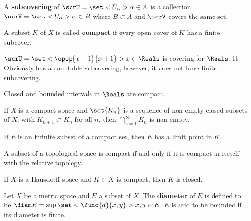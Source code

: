 \begin{definition}
    A  \textbf{subcovering} of \(\scrU = \set<U_{\alpha}>{\alpha \in A}\) is a collection \(\scrV = \set<U_{\alpha}>{\alpha \in B}\) where \(B \subset A\) and \(\scrV\) covers the same set.
\end{definition}

\begin{definition}
    A subset \(K\) of \(X\) is called \textbf{compact} if every open cover of \(K\) has a finite subcover.
\end{definition}

\begin{example}
    \(\scrU = \set<\opop{x-1}{x+1}>{x \in \Reals}\) is covering for \(\Reals\). It Obviously has a countable subcovering, however, it does not have finite subcovering.
\end{example}

\begin{theorem}
    Closed and bounded intervals in \(\Reals\) are compact.
\end{theorem}

\begin{proposition}
    If \(X\) is a compact space and \(\set{K_n}\) is a sequence of non-empty closed subsets of \(X\), with \(K_{n+1} \subset K_n\) for all \(n\), then \(\bigcap_{n = 1}^{\infty} K_n\) is non-empty.
\end{proposition}

\begin{proposition}
    If \(E\) is an infinite subset of a compact set, then \(E\) has a limit point in \(K\).
\end{proposition}

\begin{proposition}
    A subset of a topological space is compact if and only if it is compact in iteself with the relative topology.
\end{proposition}

\begin{proposition}
    If \(X\) is a Hausdorff space and \(K \subset X\) is compact, then \(K\) is closed.
\end{proposition}

\begin{definition}
    Let \(X\) be a metric space and \(E\) a subset of \(X\). The \textbf{diameter} of \(E\) is defined to be \(\diam E = \sup \set<\func{d}{x,y}>{x,y \in E}\). \(E\) is said to be bounded if its diameter is finite.
\end{definition}

